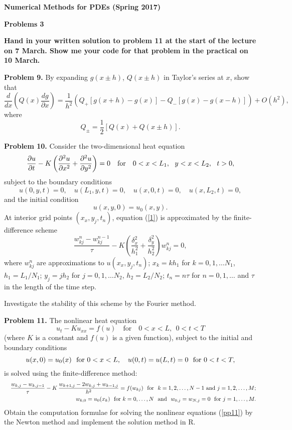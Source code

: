 \documentclass[10pt]{article}
\def\pr{{\partial}}
\begin{document}
\begin{center}
{\large{\bf Numerical Methods for PDEs (Spring 2017)}}
\end{center}

\begin{center}
{\large{\bf Problems 3}}
\end{center}

\noindent
{\bf Hand in your written solution to problem 11 at the start of the lecture on 7 March. Show me your code for that problem in the practical on 10 March.}

\vskip 0.5cm \noindent
{\bf Problem 9.} By  expanding $g(x\pm h)$, $Q(x\pm h)$ in Taylor's series at $x$,
show that
\[
\frac{d }{d x}\left(Q(x)
\frac{d g}{\pr x}\right)=\frac{1}{h^2}
\left(Q_{+}\left[g(x+h)-g(x)\right]-
Q_{-}\left[g(x)-g(x-h)\right]\right) +O(h^2),
\]
where
\[
Q_{\pm}=\frac{1}{2}\left[Q(x)+Q(x\pm h)\right].
\]

\vskip 0.5cm \noindent
{\bf Problem 10.} Consider the two-dimensional heat equation
\begin{equation}
\frac{\partial u}{\partial t}-K \left(\frac{\partial^{2}u}{\partial
x^{2}}+\frac{\partial^{2}u}{\partial
y^{2}}\right)=0 \quad \hbox{for} \quad 0<x<L_{1}, \ \ y<x<L_{2}, \ \ t>0, \label{1}
\end{equation}
subject to the boundary conditions
\[
u(0,y,t)=0, \quad u(L_{1},y,t)=0, \quad
u(x,0,t)=0, \quad u(x,L_{2},t)=0,
\]
and the initial condition
\[
u(x,y,0)=u_{0}(x,y).
\]
At interior grid points $(x_{x},y_{j},t_{n})$, equation (\ref{1}) is approximated by the finite-difference scheme
\[
\frac{w_{kj}^{n}-w_{kj}^{n-1}}{\tau} -K\left(\frac{\delta_{x}^2}{h_{1}^2}
+\frac{\delta_{y}^2}{h_{2}^2}\right)w_{kj}^{n}=0,
\]
where $w_{kj}^{n}$ are approximations to $u(x_{x},y_{j},t_{n})$; $x_{k}=k h_{1}$ for $k=0,1,\dots N_{1}$,
$h_{1}=L_{1}/N_{1}$; $y_{j}=j h_{2}$ for $j=0,1,\dots N_{2}$,
$h_{2}=L_{2}/N_{2}$; $t_{n}=n\tau$ for $n=0,1,\dots$ and $\tau$ in the length of the time step.

\vskip 0.3cm
\noindent
Investigate the stability of this scheme by the Fourier method.

\vskip 0.5cm \noindent
{\bf Problem 11.} The nonlinear heat equation
\[
u_t -K u_{xx}=f(u) \quad \textrm{for} \quad 0 < x < L, \ \ 0 < t < T
\]
(where $K$ is a constant and $f(u)$ is a given function), subject to the initial and boundary conditions
\[
u(x,0)=u_0(x) \ \ \hbox{for} \ 0 < x < L, \quad u(0,t)=u(L,t)=0  \ \ \hbox{for} \ 0 < t < T,
\]
is solved using the finite-difference method:
\begin{eqnarray}
&&\frac{w_{k,j}-w_{k,j-1}}{\tau}-
K \, \frac{w_{k+1,j}-2w_{k,j}+w_{k-1,j}}{h^{2}}=f(w_{kj}) \ \ \hbox{for} \ \ k=1,2,\dots,N-1 \  \hbox{and} \ j=1,2,\dots,M; \label{pp11} \\
&&w_{k,0}=u_0(x_{k}) \ \ \hbox{for} \ k=0, \dots,N \ \ \hbox{and} \ \ w_{0,j}=w_{N,j}=0 \ \ \hbox{for} \ j=1, \dots,M . \label{pp22}
\end{eqnarray}
Obtain the computation formulae for solving the nonlinear equations (\ref{pp11}) by the Newton method and implement the solution method in R.
\end{document}

